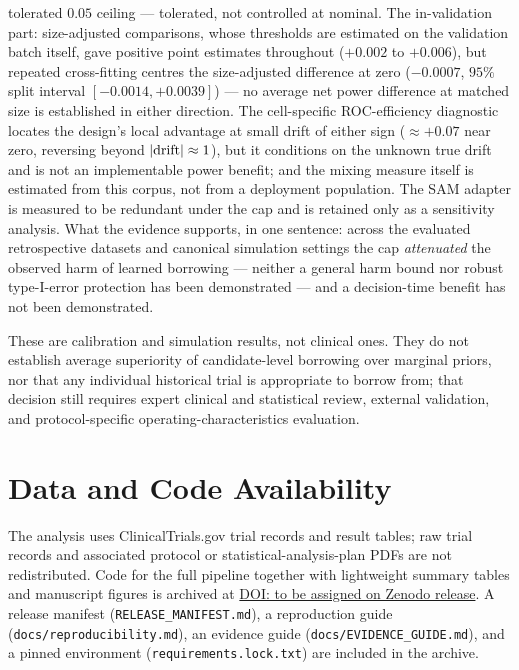 \documentclass[11pt]{article}
\begin{document}
tolerated $0.05$ ceiling --- tolerated, not controlled at nominal. The
in-validation part: size-adjusted comparisons, whose thresholds are
estimated on the validation batch itself, gave positive point estimates
throughout ($+0.002$ to $+0.006$), but repeated cross-fitting centres the
size-adjusted difference at zero ($-0.0007$, $95\%$ split interval
$[-0.0014, +0.0039]$) --- no average net power difference at matched
size is established in either direction. The cell-specific
ROC-efficiency diagnostic locates the design's local advantage at small
drift of either sign ($\approx +0.07$ near zero, reversing beyond
$|{\rm drift}| \approx 1$), but it conditions on the unknown true drift
and is not an implementable power benefit; and the mixing measure itself
is estimated from this corpus, not from a
deployment population. The SAM adapter is
measured to be redundant under the cap and is retained only as a
sensitivity analysis. What the evidence supports, in one sentence: across
the evaluated retrospective datasets and canonical simulation settings the
cap \emph{attenuated} the observed harm of learned borrowing --- neither a
general harm bound nor robust type-I-error protection has been
demonstrated --- and a decision-time benefit has not been demonstrated.

These are calibration and simulation results, not clinical ones. They do not
establish average superiority of candidate-level borrowing over marginal
priors, nor that any individual historical trial is appropriate to borrow
from; that decision still requires expert clinical and statistical review,
external validation, and protocol-specific operating-characteristics
evaluation.

\section*{Data and Code Availability}
{\sloppy
The analysis uses ClinicalTrials.gov trial records and result tables; raw trial
records and associated protocol or statistical-analysis-plan PDFs are not
redistributed. Code for the full pipeline together with lightweight summary
tables and manuscript figures is archived at
\href{https://doi.org/}{DOI: to be assigned on Zenodo release}. A release
manifest (\texttt{RELEASE\_MANIFEST.md}), a reproduction guide
(\texttt{docs/rep\-ro\-du\-ci\-bi\-li\-ty.md}), an evidence guide
(\texttt{docs/EVIDENCE\_GUIDE.md}), and a pinned environment
(\texttt{requirements.lock.txt}) are included in the archive.
\par}
\end{document}
